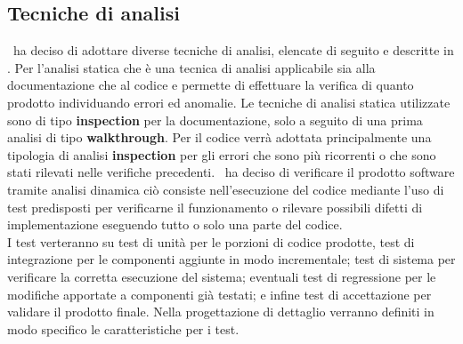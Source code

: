\subsection{Tecniche di analisi}
\gruppo ~ha deciso di adottare diverse tecniche di analisi, elencate di seguito e descritte in \infoNDP.
Per l'analisi statica che è una tecnica di analisi applicabile sia alla documentazione che al codice e permette di effettuare la verifica di quanto prodotto individuando errori ed anomalie. Le tecniche di analisi statica utilizzate sono di tipo \textbf{inspection} per la documentazione, solo a seguito di una prima analisi di tipo \textbf{walkthrough}. Per il codice verrà adottata principalmente una tipologia di analisi \textbf{inspection} per gli errori che sono più ricorrenti o che sono stati rilevati nelle verifiche precedenti.
\gruppo ~ha deciso di verificare il prodotto software tramite analisi dinamica ciò consiste nell'esecuzione del codice mediante l'uso di test predisposti per verificarne il funzionamento o rilevare possibili difetti di implementazione eseguendo tutto o solo una parte del codice.\\
I test verteranno su test di unità per le porzioni di codice prodotte, test di integrazione per le componenti aggiunte in modo incrementale; test di sistema per verificare la corretta esecuzione del sistema; eventuali test di regressione per le modifiche apportate a componenti già testati; e infine test di accettazione per validare il prodotto finale.
Nella progettazione di dettaglio verranno definiti in modo specifico le caratteristiche per i test.